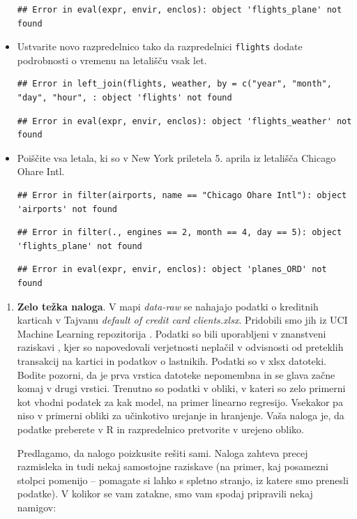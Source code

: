 \documentclass[
]{book}
\begin{document}
\begin{itemize}
\begin{verbatim}
## Error in eval(expr, envir, enclos): object 'flights_plane' not found
\end{verbatim}
\item
  Ustvarite novo razpredelnico tako da razpredelnici \texttt{flights} dodate podrobnosti o vremenu na letališču vsak let.

\begin{verbatim}
## Error in left_join(flights, weather, by = c("year", "month", "day", "hour", : object 'flights' not found
\end{verbatim}

\begin{verbatim}
## Error in eval(expr, envir, enclos): object 'flights_weather' not found
\end{verbatim}
\item
  Poiščite vsa letala, ki so v New York priletela 5. aprila iz letališča Chicago Ohare Intl.

\begin{verbatim}
## Error in filter(airports, name == "Chicago Ohare Intl"): object 'airports' not found
\end{verbatim}

\begin{verbatim}
## Error in filter(., engines == 2, month == 4, day == 5): object 'flights_plane' not found
\end{verbatim}

\begin{verbatim}
## Error in eval(expr, envir, enclos): object 'planes_ORD' not found
\end{verbatim}
\end{itemize}

\begin{enumerate}
\def\labelenumi{\arabic{enumi})}
\setcounter{enumi}{4}
\item
  \textbf{Zelo težka naloga}. V mapi \emph{data-raw} se nahajajo podatki o kreditnih karticah v Tajvanu \emph{default of credit card clients.xlsx}. Pridobili smo jih iz UCI Machine Learning repozitorija \citep{Dua2019}. Podatki so bili uporabljeni v znanstveni raziskavi \citep{Yeh2009}, kjer so napovedovali verjetnosti neplačil v odvisnosti od preteklih transakcij na kartici in podatkov o lastnikih. Podatki so v xlsx datoteki. Bodite pozorni, da je prva vrstica datoteke nepomembna in se glava začne komaj v drugi vrstici. Trenutno so podatki v obliki, v kateri so zelo primerni kot vhodni podatek za kak model, na primer linearno regresijo. Vsekakor pa niso v primerni obliki za učinkotivo urejanje in hranjenje. Vaša naloga je, da podatke preberete v R in razpredelnico pretvorite v urejeno obliko.

  Predlagamo, da nalogo poizkusite rešiti sami. Naloga zahteva precej razmisleka in tudi nekaj samostojne raziskave (na primer, kaj posamezni stolpci pomenijo -- pomagate si lahko s spletno stranjo, iz katere smo prenesli podatke). V kolikor se vam zatakne, smo vam spodaj pripravili nekaj namigov:
\end{enumerate}
\end{document}

